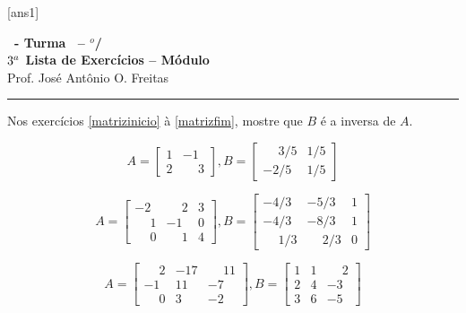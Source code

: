 \documentclass[12pt]{exam}
\begin{document}
  [ans1]
  \begin{center}
    {\Large\bf \disciplina\ - Turma \turma\ -- \semestre$^{o}$/\ano} \\ \vspace{9pt} {\large\bf
        $3^a$ Lista de Exercícios -- Módulo \numeromodulo}\\ \vspace{9pt} Prof. José Antônio O. Freitas
  \end{center}
  \hrule


Nos exercícios \ref{matrizinicio} à \ref{matrizfim}, mostre que $B$ é a inversa de $A$.
\begin{exercicio}\label{matrizinicio}
  \[
    A =\begin{bmatrix}
      1 & -1\\
      2 & \phantom{-} 3
    \end{bmatrix}, B =\begin{bmatrix}
      \phantom{-} 3/5 & 1/5\\
      -2/5 & 1/5
    \end{bmatrix}
  \]
\end{exercicio}

\begin{exercicio}
  \[
    A =\begin{bmatrix}
      -2 & \phantom{-} 2 & 3\\
      \phantom{-} 1 & -1 & 0\\
      \phantom{-} 0 & \phantom{-} 1 & 4
    \end{bmatrix}, B =\begin{bmatrix}
      -4/3 & -5/3 & 1\\
      -4/3 & -8/3 & 1\\
      \phantom{-} 1/3 & \phantom{-} 2/3 & 0
    \end{bmatrix}
  \]
\end{exercicio}

\begin{exercicio}\label{matrizfim}
  \[
    A =\begin{bmatrix}
      \phantom{-} 2 & -17 & \phantom{-} 11\\
      -1 & 11 & -7\\
      \phantom{-} 0 & 3 & -2
    \end{bmatrix}, B =\begin{bmatrix}
      1 & 1 & \phantom{-} 2\\
      2 & 4 & -3\\
      3 & 6 & -5
    \end{bmatrix}
  \]
\end{exercicio}
\end{document}
